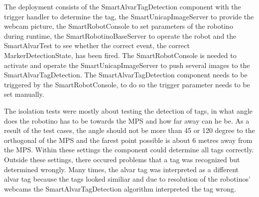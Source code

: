 The deployment consists of the SmartAlvarTagDetection component with the trigger handler to determine the tag, the SmartUnicapImageServer to provide the webcam picture, the SmartRobotConsole to set parameters of the robotino during runtime, the SmartRobotinoBaseServer to operate the robot and the SmartAlvarTest to see whether the correct event, the correct MarkerDetectionState, has been fired. The SmartRobotConsole is needed to activate and operate the SmartUnicapImageServer to push several images to the SmartAlvarTagDetection. The SmartAlvarTagDetection component needs to be triggered by the SmartRobotConsole, to do so the trigger parameter needs to be set manually. 

The isolation tests were mostly about testing the detection of tags, in what angle does the robotino has to be towards the MPS and how far away can he be. As a result of the test cases, the angle should not be more than 45 or 120 degree to the orthogonal of the MPS and the farest point possible is about 6 metres away from the MPS. Within these settings the component could determine all tags correctly. Outside these settings, there occured problems that a tag was recognized but determined wrongly. Many times, the alvar tag was interpreted as a different alvar tag because the tags looked similiar and due to resolution of the robotinos' webcams the SmartAlvarTagDetection algorithm interpreted the tag wrong.




